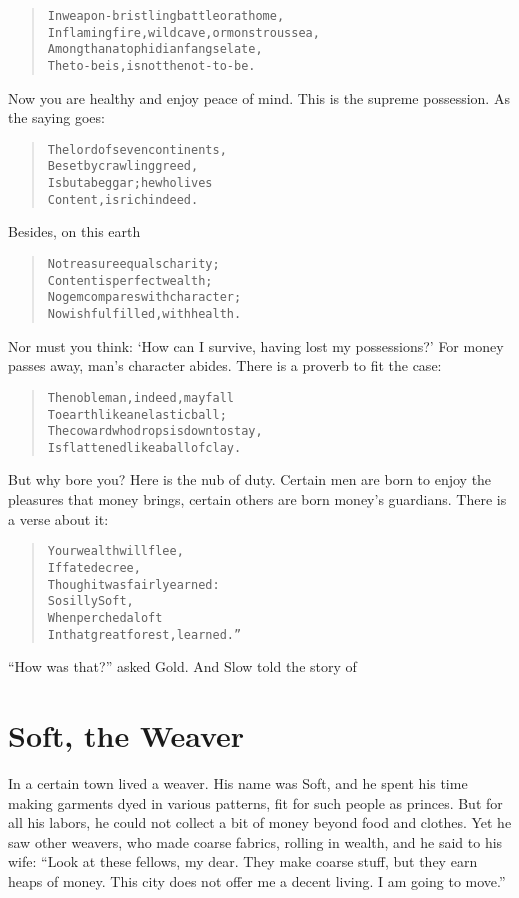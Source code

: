 \documentclass[article, twoside, 14pt]{memoir}
\renewenvironment{verbatim}{%
\begin{quote}%
\vskip -10pt%
\begin{alltt}\normalfont\large}{\end{alltt}%
\end{quote}%
\vskip -10pt
} %
\begin{document}
\begin{verbatim}
In weapon-bristling battle or at home,
    In flaming fire, wild cave, or monstrous sea,
Among thanatophidian fangs elate,
    The to-be is, is not the not-to-be.
\end{verbatim}
Now you are healthy and enjoy peace of mind. This is the supreme
possession. As the saying goes:

\begin{verbatim}
The lord of seven continents,
    Beset by crawling greed,
Is but a beggar; he who lives
    Content, is rich indeed.
\end{verbatim}
Besides, on this earth

\begin{verbatim}
No treasure equals charity;
    Content is perfect wealth;
No gem compares with character;
    No wish fulfilled, with health.
\end{verbatim}
Nor must you think:
`How can I survive, having lost my possessions?' For money passes
away, man's character abides. There is a proverb to fit the case:

\begin{verbatim}
The noble man, indeed, may fall
To earth{\textemdash}like an elastic ball;
The coward who drops is down to stay,
Is flattened like a ball of clay.
\end{verbatim}
But why bore you? Here is the nub of duty. Certain men are born to
enjoy the pleasures that money brings, certain others are born
money's guardians. There is a verse about it:

\begin{verbatim}
Your wealth will flee,
If fate decree,
Though it was fairly earned:
    So silly Soft,
    When perched aloft
In that great forest, learned.”
\end{verbatim}
``How was that?'' asked Gold. And Slow told the story of

\chapter{Soft, the Weaver}

\label{s42}

In a certain town lived a weaver. His name was Soft, and he spent
his time making garments dyed in various patterns, fit for such
people as princes. But for all his labors, he could not collect a
bit of money beyond food and clothes. Yet he saw other weavers, who
made coarse fabrics, rolling in wealth, and he said to his wife:
``Look at these fellows, my dear. They make coarse stuff, but they earn heaps of money. This city does not offer me a decent living. I am going to move.''
\end{document}
